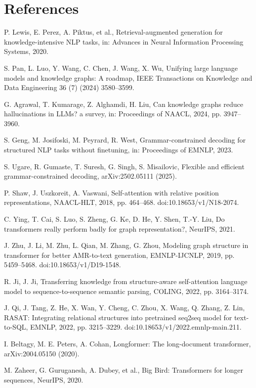 \documentclass[preprint,11pt]{elsarticle}
\begin{document}
\section*{References}
\small
\begin{enumerate}[label={[\arabic*]},leftmargin=2.2em,itemsep=.28em,parsep=0pt]
\item P. Lewis, E. Perez, A. Piktus, et al., Retrieval-augmented generation for knowledge-intensive NLP tasks, in: Advances in Neural Information Processing Systems, 2020.
\item S. Pan, L. Luo, Y. Wang, C. Chen, J. Wang, X. Wu, Unifying large language models and knowledge graphs: A roadmap, IEEE Transactions on Knowledge and Data Engineering 36 (7) (2024) 3580--3599.
\item G. Agrawal, T. Kumarage, Z. Alghamdi, H. Liu, Can knowledge graphs reduce hallucinations in LLMs? a survey, in: Proceedings of NAACL, 2024, pp. 3947--3960.
\item S. Geng, M. Josifoski, M. Peyrard, R. West, Grammar-constrained decoding for structured NLP tasks without finetuning, in: Proceedings of EMNLP, 2023.
\item S. Ugare, R. Gumaste, T. Suresh, G. Singh, S. Misailovic, Flexible and efficient grammar-constrained decoding, arXiv:2502.05111 (2025).
\item P. Shaw, J. Uszkoreit, A. Vaswani, Self-attention with relative position representations, NAACL-HLT, 2018, pp. 464--468. doi:10.18653/v1/N18-2074.
\item C. Ying, T. Cai, S. Luo, S. Zheng, G. Ke, D. He, Y. Shen, T.-Y. Liu, Do transformers really perform badly for graph representation?, NeurIPS, 2021.
\item J. Zhu, J. Li, M. Zhu, L. Qian, M. Zhang, G. Zhou, Modeling graph structure in transformer for better AMR-to-text generation, EMNLP-IJCNLP, 2019, pp. 5459--5468. doi:10.18653/v1/D19-1548.
\item R. Ji, J. Ji, Transferring knowledge from structure-aware self-attention language model to sequence-to-sequence semantic parsing, COLING, 2022, pp. 3164--3174.
\item J. Qi, J. Tang, Z. He, X. Wan, Y. Cheng, C. Zhou, X. Wang, Q. Zhang, Z. Lin, RASAT: Integrating relational structures into pretrained seq2seq model for text-to-SQL, EMNLP, 2022, pp. 3215--3229. doi:10.18653/v1/2022.emnlp-main.211.
\item I. Beltagy, M. E. Peters, A. Cohan, Longformer: The long-document transformer, arXiv:2004.05150 (2020).
\item M. Zaheer, G. Guruganesh, A. Dubey, et al., Big Bird: Transformers for longer sequences, NeurIPS, 2020.

\end{enumerate}
\end{document}
